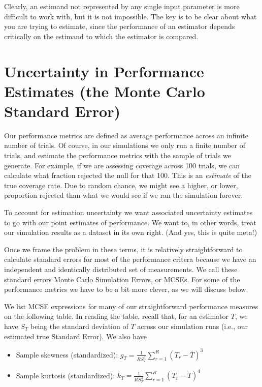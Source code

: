 \documentclass[
]{book}
\providecommand{\tightlist}{%
  \setlength{\itemsep}{0pt}\setlength{\parskip}{0pt}}
\begin{document}
Clearly, an estimand not represented by any single input parameter is more difficult to work with, but it is not impossible.
The key is to be clear about what you are trying to estimate, since the performance of an estimator depends critically on the estimand to which the estimator is compared.

\section{Uncertainty in Performance Estimates (the Monte Carlo Standard Error)}\label{MCSE}

Our performance metrics are defined as average performance across an infinite number of trials.
Of course, in our simulations we only run a finite number of trials, and estimate the performance metrics with the sample of trials we generate.
For example, if we are assessing coverage across 100 trials, we can calculate what fraction rejected the null for that 100.
This is an \emph{estimate} of the true coverage rate.
Due to random chance, we might see a higher, or lower, proportion rejected than what we would see if we ran the simulation forever.

To account for estimation uncertainty we want associated uncertainty estimates to go with our point estimates of performance.
We want to, in other words, treat our simulation results as a dataset in its own right.
(And yes, this is quite meta!)

Once we frame the problem in these terms, it is relatively straightforward to calculate standard errors for most of the performance critera because we have an independent and identically distributed set of measurements.
We call these standard errors Monte Carlo Simulation Errors, or MCSEs.
For some of the performance metrics we have to be a bit more clever, as we will discuss below.

We list MCSE expressions for many of our straightforward performance measures on the following table.
In reading the table, recall that, for an estimator \(T\), we have \(S_T\) being the standard deviation of \(T\) across our simulation runs (i.e., our estimated true Standard Error).
We also have

\begin{itemize}
\tightlist
\item
  Sample skewness (standardized): \(\displaystyle{g_T = \frac{1}{R S_T^3}\sum_{r=1}^R \left(T_r - \bar{T}\right)^3}\)
\item
  Sample kurtosis (standardized): \(\displaystyle{k_T = \frac{1}{R S_T^4} \sum_{r=1}^R \left(T_r - \bar{T}\right)^4}\)
\end{itemize}
\end{document}
